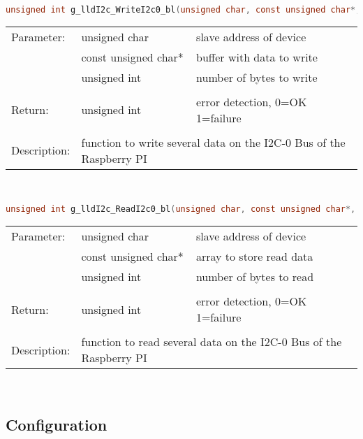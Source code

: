 
\begin{lstlisting}[language=C, basicstyle=\small, caption=Write on I2C-0]
unsigned int g_lldI2c_WriteI2c0_bl(unsigned char, const unsigned char*, unsigned int);
\end{lstlisting}


\begin{tabular}{lll}
Parameter: & unsigned char & slave address of device\\
					 & const unsigned char* & buffer with data to write\\
					 & unsigned int & number of bytes to write\\
					 &	\\
Return: & unsigned int & error detection, 0=OK 1=failure\\
							&&\\
Description: & \multicolumn{2}{l}{function to write several data on the I2C-0 Bus of the Raspberry PI}\\
\end{tabular}
\\



\begin{lstlisting}[language=C, basicstyle=\small, caption=Read from I2C-0]
unsigned int g_lldI2c_ReadI2c0_bl(unsigned char, const unsigned char*, unsigned int);
\end{lstlisting}

\begin{tabular}{lll}
Parameter: & unsigned char & slave address of device\\
					 & const unsigned char* & array to store read data\\
					 & unsigned int & number of bytes to read\\
					 &	\\
Return: & unsigned int & error detection, 0=OK 1=failure\\
							&&\\
Description: & \multicolumn{2}{l}{function to read several data on the I2C-0 Bus of the Raspberry PI}\\
\end{tabular}
\\





\subsection{Configuration}

